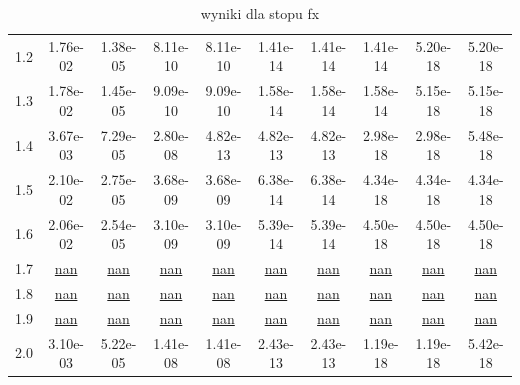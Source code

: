 \begin{table}[h!]
\begin{tabular}{l|c|c|c|c|c|c|c|c|c|}
1.2 & \cellcolor{red!25}1.76e-02 & \cellcolor{red!25}1.38e-05 & \cellcolor{red!25}8.11e-10 & \cellcolor{red!25}8.11e-10 & \cellcolor{red!25}1.41e-14 & \cellcolor{red!25}1.41e-14 & \cellcolor{red!25}1.41e-14 & \cellcolor{red!25}5.20e-18 & \cellcolor{red!25}5.20e-18 \\
1.3 & \cellcolor{red!25}1.78e-02 & \cellcolor{red!25}1.45e-05 & \cellcolor{red!25}9.09e-10 & \cellcolor{red!25}9.09e-10 & \cellcolor{red!25}1.58e-14 & \cellcolor{red!25}1.58e-14 & \cellcolor{red!25}1.58e-14 & \cellcolor{red!25}5.15e-18 & \cellcolor{red!25}5.15e-18 \\
1.4 & \cellcolor{red!25}3.67e-03 & \cellcolor{red!25}7.29e-05 & \cellcolor{red!25}2.80e-08 & \cellcolor{red!25}4.82e-13 & \cellcolor{red!25}4.82e-13 & \cellcolor{red!25}4.82e-13 & \cellcolor{red!25}2.98e-18 & \cellcolor{red!25}2.98e-18 & \cellcolor{red!25}5.48e-18 \\
1.5 & \cellcolor{red!25}2.10e-02 & \cellcolor{red!25}2.75e-05 & \cellcolor{red!25}3.68e-09 & \cellcolor{red!25}3.68e-09 & \cellcolor{red!25}6.38e-14 & \cellcolor{red!25}6.38e-14 & \cellcolor{red!25}4.34e-18 & \cellcolor{red!25}4.34e-18 & \cellcolor{red!25}4.34e-18 \\
1.6 & \cellcolor{red!25}2.06e-02 & \cellcolor{red!25}2.54e-05 & \cellcolor{red!25}3.10e-09 & \cellcolor{red!25}3.10e-09 & \cellcolor{red!25}5.39e-14 & \cellcolor{red!25}5.39e-14 & \cellcolor{red!25}4.50e-18 & \cellcolor{red!25}4.50e-18 & \cellcolor{red!25}4.50e-18 \\
1.7 & \cellcolor{red!25}\underline{nan} & \cellcolor{red!25}\underline{nan} & \cellcolor{red!25}\underline{nan} & \cellcolor{red!25}\underline{nan} & \cellcolor{red!25}\underline{nan} & \cellcolor{red!25}\underline{nan} & \cellcolor{red!25}\underline{nan} & \cellcolor{red!25}\underline{nan} & \cellcolor{red!25}\underline{nan} \\
1.8 & \cellcolor{red!25}\underline{nan} & \cellcolor{red!25}\underline{nan} & \cellcolor{red!25}\underline{nan} & \cellcolor{red!25}\underline{nan} & \cellcolor{red!25}\underline{nan} & \cellcolor{red!25}\underline{nan} & \cellcolor{red!25}\underline{nan} & \cellcolor{red!25}\underline{nan} & \cellcolor{red!25}\underline{nan} \\
1.9 & \cellcolor{red!25}\underline{nan} & \cellcolor{red!25}\underline{nan} & \cellcolor{red!25}\underline{nan} & \cellcolor{red!25}\underline{nan} & \cellcolor{red!25}\underline{nan} & \cellcolor{red!25}\underline{nan} & \cellcolor{red!25}\underline{nan} & \cellcolor{red!25}\underline{nan} & \cellcolor{red!25}\underline{nan} \\
2.0 & \cellcolor{red!25}3.10e-03 & \cellcolor{red!25}5.22e-05 & \cellcolor{red!25}1.41e-08 & \cellcolor{red!25}1.41e-08 & \cellcolor{red!25}2.43e-13 & \cellcolor{red!25}2.43e-13 & \cellcolor{red!25}1.19e-18 & \cellcolor{red!25}1.19e-18 & \cellcolor{red!25}5.42e-18 \\
\bottomrule
\end{tabular}\caption{wyniki dla stopu fx}
\end{table}